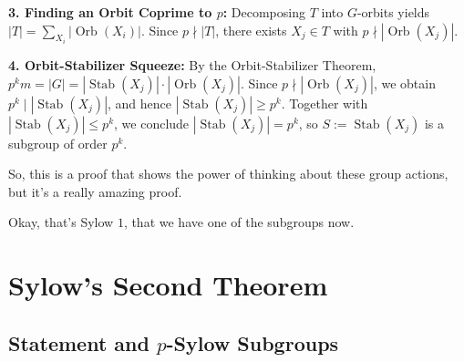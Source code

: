\begin{proofWrapper}
\begin{content}
\textbf{3. Finding an Orbit Coprime to $p$:} Decomposing $T$ into $G$-orbits yields $|T| = \sum_{X_i} |\operatorname{Orb}(X_i)|$. Since $p \nmid |T|$, there exists $X_j \in T$ with $p \nmid |\operatorname{Orb}(X_j)|$.

\textbf{4. Orbit-Stabilizer Squeeze:} By the Orbit-Stabilizer Theorem, $p^k m = |G| = |\operatorname{Stab}(X_j)| \cdot |\operatorname{Orb}(X_j)|$. Since $p \nmid |\operatorname{Orb}(X_j)|$, we obtain $p^k \mid |\operatorname{Stab}(X_j)|$, and hence $|\operatorname{Stab}(X_j)| \ge p^k$. Together with $|\operatorname{Stab}(X_j)| \le p^k$, we conclude $|\operatorname{Stab}(X_j)| = p^k$, so $S := \operatorname{Stab}(X_j)$ is a subgroup of order $p^k$.
\end{content}

\end{proofWrapper}

\begin{speech}[00:16:44 - 00:17:02]
So, this is a proof that shows the power of thinking about these group actions, but it's a really amazing proof.

Okay, that's Sylow $1$, that we have one of the subgroups now.
\end{speech}

\section{Sylow's Second Theorem}

\subsection{Statement and \texorpdfstring{$p$}{p}-Sylow Subgroups}

